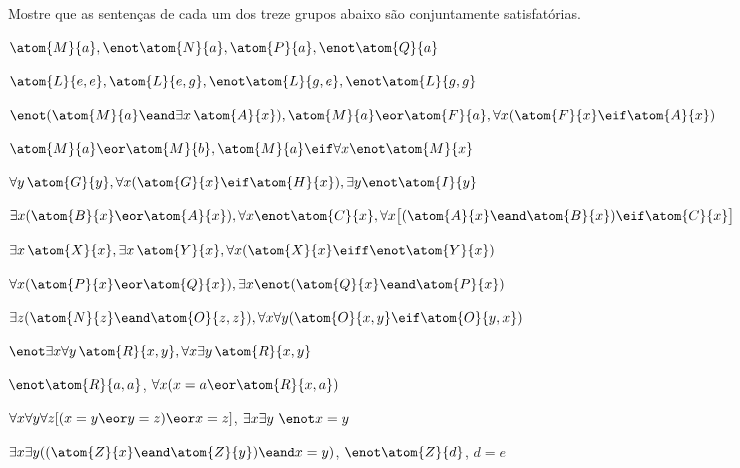 \problempart
Mostre que as sentenças de cada um dos treze grupos abaixo são conjuntamente satisfatórias.
\begin{earg}
\item  $\atom{M}{a}, \enot \atom{N}{a}, \atom{P}{a}, \enot \atom{Q}{a}$
\item $\atom{L}{e,e}, \atom{L}{e,g}, \enot \atom{L}{g,e}, \enot \atom{L}{g,g}$
\item $\enot (\atom{M}{a} \eand \exists x\, \atom{A}{x}), \atom{M}{a} \eor \atom{F}{a}, \forall x(\atom{F}{x} \eif \atom{A}{x})$
\item $\atom{M}{a} \eor \atom{M}{b}, \atom{M}{a} \eif \forall x \enot \atom{M}{x}$
\item $\forall y\, \atom{G}{y}, \forall x (\atom{G}{x} \eif \atom{H}{x}), \exists y \enot \atom{I}{y}$
\item $\exists x(\atom{B}{x} \eor \atom{A}{x}), \forall x \enot \atom{C}{x}, \forall x\bigl[(\atom{A}{x} \eand \atom{B}{x}) \eif \atom{C}{x}\bigr]$
\item $\exists x\, \atom{X}{x}, \exists x\, \atom{Y}{x}, \forall x(\atom{X}{x} \eiff \enot \atom{Y}{x})$
\item $\forall x(\atom{P}{x} \eor \atom{Q}{x}), \exists x\enot(\atom{Q}{x} \eand \atom{P}{x})$
\item $\exists z(\atom{N}{z} \eand \atom{O}{z,z}), \forall x\forall y(\atom{O}{x,y} \eif \atom{O}{y,x})$
\item $\enot \exists x \forall y\, \atom{R}{x,y}, \forall x \exists y\, \atom{R}{x,y}$
\item $\enot \atom{R}{a,a}$, $\forall x (x=a \eor \atom{R}{x,a})$
\item $\forall x\forall y\forall z[(x=y \eor y=z )\eor x=z]$, $\exists x\exists y\ \enot x= y$
\item $\exists x\exists y((\atom{Z}{x} \eand \atom{Z}{y} )\eand x=y)$, $\enot \atom{Z}{d}$, $d=e$
\end{earg}

